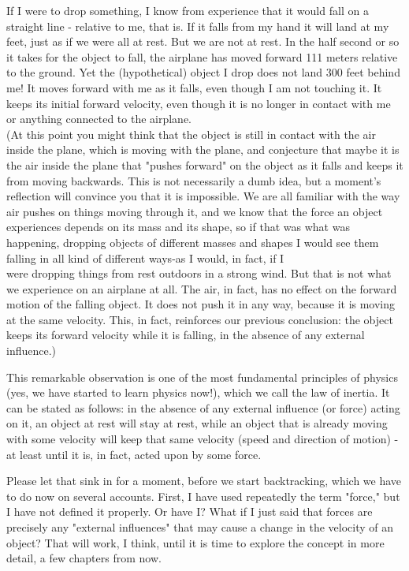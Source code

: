 \documentclass[10pt]{article}
\begin{document}
If I were to drop something, I know from experience that it would fall on a straight line - relative to me, that is. If it falls from my hand it will land at my feet, just as if we were all at rest. But we are not at rest. In the half second or so it takes for the object to fall, the airplane has moved forward 111 meters relative to the ground. Yet the (hypothetical) object I drop does not land 300 feet behind me! It moves forward with me as it falls, even though I am not touching it. It keeps its initial forward velocity, even though it is no longer in contact with me or anything connected to the airplane.\\
(At this point you might think that the object is still in contact with the air inside the plane, which is moving with the plane, and conjecture that maybe it is the air inside the plane that "pushes forward" on the object as it falls and keeps it from moving backwards. This is not necessarily a dumb idea, but a moment's reflection will convince you that it is impossible. We are all familiar with the way air pushes on things moving through it, and we know that the force an object experiences depends on its mass and its shape, so if that was what was happening, dropping objects of different masses and shapes I would see them falling in all kind of different ways-as I would, in fact, if I\\
were dropping things from rest outdoors in a strong wind. But that is not what we experience on an airplane at all. The air, in fact, has no effect on the forward motion of the falling object. It does not push it in any way, because it is moving at the same velocity. This, in fact, reinforces our previous conclusion: the object keeps its forward velocity while it is falling, in the absence of any external influence.)

This remarkable observation is one of the most fundamental principles of physics (yes, we have started to learn physics now!), which we call the law of inertia. It can be stated as follows: in the absence of any external influence (or force) acting on it, an object at rest will stay at rest, while an object that is already moving with some velocity will keep that same velocity (speed and direction of motion) - at least until it is, in fact, acted upon by some force.

Please let that sink in for a moment, before we start backtracking, which we have to do now on several accounts. First, I have used repeatedly the term "force," but I have not defined it properly. Or have I? What if I just said that forces are precisely any "external influences" that may cause a change in the velocity of an object? That will work, I think, until it is time to explore the concept in more detail, a few chapters from now.
\end{document}
